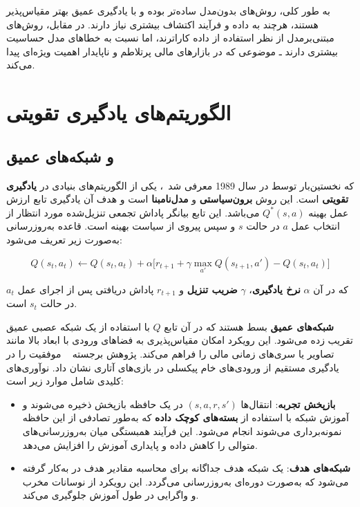 \documentclass[12pt, a4paper]{report}
\begin{document}
به طور کلی، روش‌های بدون‌مدل ساده‌تر بوده و با یادگیری عمیق بهتر مقیاس‌پذیر هستند، هرچند به داده و فرآیند اکتشاف بیشتری نیاز دارند. در مقابل، روش‌های مبتنی‌بر‌مدل از نظر استفاده از داده کاراترند، اما نسبت به خطاهای مدل حساسیت بیشتری دارند ـ موضوعی که در بازارهای مالی پرتلاطم و ناپایدار اهمیت ویژه‌ای پیدا می‌کند.


\section{الگوریتم‌های یادگیری تقویتی}

\subsection{ و شبکه‌های  عمیق\protect\footnotemark}

 که نخستین‌بار توسط  در سال 1989 معرفی شد~\cite{watkins1989q}، یکی از الگوریتم‌های بنیادی در \textbf{یادگیری تقویتی} است. این روش \textbf{برون‌سیاستی} و \textbf{مدل‌نا‌مبنا} است و هدف آن یادگیری تابع ارزش عمل بهینه $Q^*(s, a)$ می‌باشد. این تابع بیانگر پاداش تجمعی تنزیل‌شده مورد انتظار از انتخاب عمل $a$ در حالت $s$ و سپس پیروی از سیاست بهینه است. قاعده به‌روزرسانی  به‌صورت زیر تعریف می‌شود:

\[
Q(s_t, a_t) \leftarrow Q(s_t, a_t) + \alpha \Big[ r_{t+1} + \gamma \max_{a'} Q(s_{t+1}, a') - Q(s_t, a_t) \Big]
\]

که در آن $\alpha$ \textbf{نرخ یادگیری}، $\gamma$ \textbf{ضریب تنزیل} و $r_{t+1}$ پاداش دریافتی پس از اجرای عمل $a_t$ در حالت $s_t$ است.  

\bigskip

\textbf{شبکه‌های  عمیق} بسط  هستند که در آن تابع $Q$ با استفاده از یک شبکه عصبی عمیق تقریب زده می‌شود. این رویکرد امکان مقیاس‌پذیری به فضاهای ورودی با ابعاد بالا مانند تصاویر یا سری‌های زمانی مالی را فراهم می‌کند. پژوهش برجسته ~\cite{mnih2015human} موفقیت  را در یادگیری مستقیم از ورودی‌های خام پیکسلی در بازی‌های آتاری نشان داد. نوآوری‌های کلیدی  شامل موارد زیر است:  

\begin{itemize}
\item \textbf{بازپخش تجربه}: انتقال‌ها $(s, a, r, s')$ در یک حافظه بازپخش ذخیره می‌شوند و آموزش شبکه با استفاده از \textbf{بسته‌های کوچک داده} که به‌طور تصادفی از این حافظه نمونه‌برداری می‌شوند انجام می‌شود. این فرآیند همبستگی میان به‌روزرسانی‌های متوالی را کاهش داده و پایداری آموزش را افزایش می‌دهد.

    \item \textbf{شبکه‌های هدف}: یک شبکه هدف جداگانه برای محاسبه مقادیر هدف در  به‌کار گرفته می‌شود که به‌صورت دوره‌ای به‌روزرسانی می‌گردد. این رویکرد از نوسانات مخرب و واگرایی در طول آموزش جلوگیری می‌کند.
\end{itemize}
\end{document}
